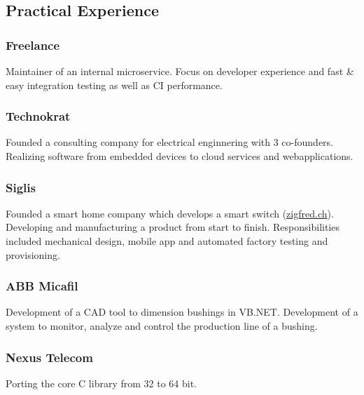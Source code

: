     \begin{timeline}
    
    
    \subsection{Practical Experience}

    \subsubsection{Freelance}
    Maintainer of an internal microservice.
    Focus on developer experience and fast \& easy integration testing as well as CI performance.
    \sectionsep
    
    \subsubsection{Technokrat}
    Founded a consulting company for electrical enginnering with 3 co-founders.
    Realizing software from embedded devices to cloud services and webapplications.
    \sectionsep

    \subsubsection{Siglis}
    Founded a smart home company which develops a smart switch (\href{https://zigfred.ch}{zigfred.ch}).
    Developing and manufacturing a product from start to finish. Responsibilities included mechanical design, mobile app and automated factory testing and provisioning.
    \sectionsep

    \subsubsection{ABB Micafil}
    Development of a CAD tool to dimension bushings in VB.NET.
    Development of a system to monitor, analyze and control the production line of a bushing.
    \sectionsep
    
    \subsubsection{Nexus Telecom}
    Porting the core C library from 32 to 64 bit.
    \sectionsep


\end{timeline}

